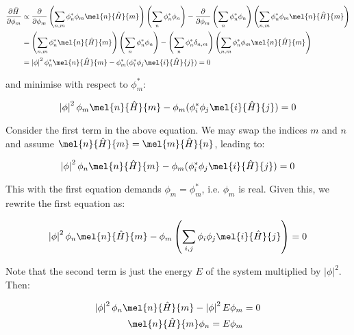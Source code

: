 \documentclass[12pt]{article}
\begin{document}
\begin{equation}
    \begin{split}
        \frac{\partial \bar{H}}{\partial \phi_{m}} &\propto \frac{\partial}{\partial \phi_{m}} \left( \sum_{n, m} \phi_{n}^{*} \phi_{m} \mel{n}{\hat{H}}{m} \right) \left( \sum_{n} \phi_{n}^{*} \phi_{n} \right) - \frac{\partial}{\partial \phi_{m}} \left( \sum_{n} \phi_{n}^{*} \phi_{n} \right) \left( \sum_{n, m} \phi_{n}^{*} \phi_{m} \mel{n}{\hat{H}}{m} \right) \\
        &= \left( \sum_{n, m} \phi_{n}^{*} \mel{n}{\hat{H}}{m} \right) \left( \sum_{n} \phi_{n}^{*} \phi_{n} \right) - \left( \sum_{n} \phi_{n}^{*} \delta_{n, m} \right) \left( \sum_{n, m} \phi_{n}^{*} \phi_{m} \mel{n}{\hat{H}}{m} \right) \\
        &= \left\lvert \phi \right\rvert^{2} \phi_{n}^{*} \mel{n}{\hat{H}}{m} - \phi_{m}^{*} (\phi_{i}^{*} \phi_{j} \mel{i}{\hat{H}}{j}) = 0
    \end{split}
\end{equation}

and minimise with respect to $\phi_{m}^{*}$:

\begin{equation}
    \left\lvert \phi \right\rvert^{2} \phi_{m} \mel{n}{\hat{H}}{m} - \phi_{m} (\phi_{i}^{*} \phi_{j} \mel{i}{\hat{H}}{j}) = 0
\end{equation}

Consider the first term in the above equation. We may swap the indices $m$ and $n$ and assume $\mel{n}{\hat{H}}{m} = \mel{m}{\hat{H}}{n}$, leading to:

\begin{equation}
    \left\lvert \phi \right\rvert^{2} \phi_{n} \mel{n}{\hat{H}}{m} - \phi_{m} (\phi_{i}^{*} \phi_{j} \mel{i}{\hat{H}}{j}) = 0
\end{equation}

This with the first equation demands $\phi_{m} = \phi_{m}^{*}$, i.e. $\phi_{m}$ is real. Given this, we rewrite the first equation as:

\begin{equation}
    \left\lvert \phi \right\rvert^{2} \phi_{n} \mel{n}{\hat{H}}{m} - \phi_{m} \left( \sum_{i, j} \phi_{i} \phi_{j} \mel{i}{\hat{H}}{j} \right) = 0
\end{equation}

Note that the second term is just the energy $E$ of the system multiplied by $\left\lvert \phi \right\rvert^{2}$. Then:

\begin{equation}
    \begin{split}
        \left\lvert \phi \right\rvert^{2} \phi_{n} \mel{n}{\hat{H}}{m} - \left\lvert \phi \right\rvert^{2} E \phi_{m} &= 0 \\
        \mel{n}{\hat{H}}{m} \phi_{n} = E \phi_{m}
    \end{split}
\end{equation}
\end{document}
